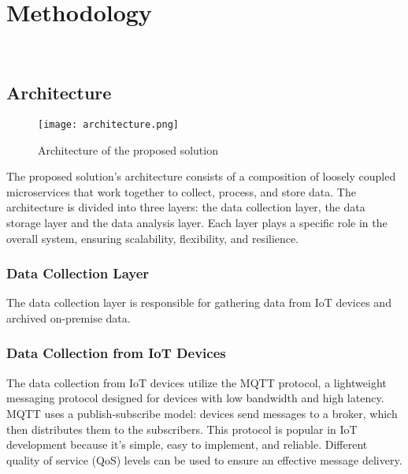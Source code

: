 \chapter{Methodology}
\label{cap:method}

\\


\section{Architecture}
\label{sec:architecture}

\begin{figure}[htbp]
    \centering
    \texttt{[image: architecture.png]}
    \caption{Architecture of the proposed solution}
\end{figure}

The proposed solution's architecture consists of a composition of loosely coupled microservices that work together to collect, process, and store data. The architecture is divided into three layers: the data collection layer, the data storage layer and the data analysis layer. Each layer plays a specific role in the overall system, ensuring scalability, flexibility, and resilience.

\subsection{Data Collection Layer}

The data collection layer is responsible for gathering data from IoT devices and archived on-premise data. 

\subsection{Data Collection from IoT Devices}

The data collection from IoT devices utilize the MQTT protocol, a lightweight messaging protocol designed for devices with low bandwidth and high latency. MQTT uses a publish-subscribe model: devices send messages to a broker, which then distributes them to the subscribers. This protocol is popular in IoT development because it's simple, easy to implement, and reliable. Different quality of service (QoS) levels can be used to ensure an effective message delivery.

